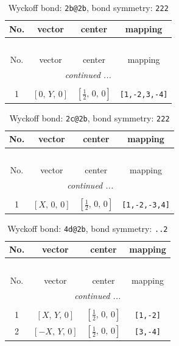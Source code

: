 \documentclass[fleqn,8pt]{jsarticle}
\begin{document}
\begin{longtable}{cccc}
\caption{Wyckoff bond: {\tt 2b@2b}, bond symmetry: {\tt 222}}
 \\
 \hline \hline
No. & vector & center & mapping \\ \hline \endfirsthead

\multicolumn{3}{l}{\tablename\ \thetable{}} \\
 \hline \hline
No. & vector & center & mapping \\ \hline \endhead

 \hline \hline
\multicolumn{3}{r}{\footnotesize\it continued ...} \\ \endfoot

 \hline \hline
\multicolumn{3}{r}{} \\ \endlastfoot

1 & $\left[ 0,\, Y,\, 0 \right]$ & $\left[ \frac{1}{2},\, 0,\, 0 \right]$ & {\tt [1,-2,3,-4]} \\
\end{longtable}
\renewcommand{\arraystretch}{1.2}
\begin{longtable}{cccc}
\caption{Wyckoff bond: {\tt 2c@2b}, bond symmetry: {\tt 222}}
 \\
 \hline \hline
No. & vector & center & mapping \\ \hline \endfirsthead

\multicolumn{3}{l}{\tablename\ \thetable{}} \\
 \hline \hline
No. & vector & center & mapping \\ \hline \endhead

 \hline \hline
\multicolumn{3}{r}{\footnotesize\it continued ...} \\ \endfoot

 \hline \hline
\multicolumn{3}{r}{} \\ \endlastfoot

1 & $\left[ X,\, 0,\, 0 \right]$ & $\left[ \frac{1}{2},\, 0,\, 0 \right]$ & {\tt [1,-2,-3,4]} \\
\end{longtable}
\renewcommand{\arraystretch}{1.2}
\begin{longtable}{cccc}
\caption{Wyckoff bond: {\tt 4d@2b}, bond symmetry: {\tt ..2}}
 \\
 \hline \hline
No. & vector & center & mapping \\ \hline \endfirsthead

\multicolumn{3}{l}{\tablename\ \thetable{}} \\
 \hline \hline
No. & vector & center & mapping \\ \hline \endhead

 \hline \hline
\multicolumn{3}{r}{\footnotesize\it continued ...} \\ \endfoot

 \hline \hline
\multicolumn{3}{r}{} \\ \endlastfoot

1 & $\left[ X,\, Y,\, 0 \right]$ & $\left[ \frac{1}{2},\, 0,\, 0 \right]$ & {\tt [1,-2]} \\ \hline
2 & $\left[ - X,\, Y,\, 0 \right]$ & $\left[ \frac{1}{2},\, 0,\, 0 \right]$ & {\tt [3,-4]} \\
\end{longtable}
\end{document}
